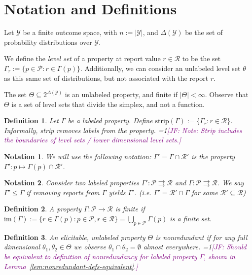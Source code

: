 \documentclass[12pt]{article}
\newcommand{\Comments}{1}
\newcommand{\mynote}[2]{\ifnum\Comments=1\textcolor{#1}{#2}\fi}
\newcommand{\jessie}[1]{\mynote{purple}{[JF: #1]}}
\renewcommand{\P}{\mathcal{P}}
\newcommand{\R}{\mathcal{R}}
\newcommand{\Y}{\mathcal{Y}}
\newcommand{\toto}{\rightrightarrows}
\newcommand{\im}{\text{im}}
\newtheorem{definition}{Definition}
\newtheorem{notation}{Notation}
\begin{document}
\section{Notation and Definitions}


Let $\Y$ be a finite outcome space, with $n:=|\Y|$, and $\Delta(\Y)$ be the set of probability distributions over $\Y$.

We define the \emph{level set} of a property at report value $r\in\R$ to be the set $\Gamma_r := \{p\in\P : r \in \Gamma(p)\}$.
Additionally, we can consider an unlabeled level set $\theta$ as this same set of distributions, but not associated with the report $r$.

The set $\Theta \subseteq 2^{\Delta(\Y)}$ is an unlabeled property, and finite if $|\Theta| < \infty$.
Observe that $\Theta$ is a set of level sets that divide the simplex, and not a function.


\begin{definition}
Let $\Gamma$ be a labeled property.
Define $\text{strip}(\Gamma) := \{ \Gamma_r : r \in \R \}$.
Informally, strip removes labels from the property.
\jessie{Note: Strip includes the boundaries of level sets / lower dimensional level sets.}
\end{definition}

\begin{notation}
We will use the following notation: $\Gamma' = \Gamma \cap \R'$ is the property $\Gamma' : p \mapsto \Gamma(p) \cap \R'$.  
\end{notation}

\begin{notation}
  Consider two labeled properties $\Gamma' : \P \toto \R$ and $\Gamma : \P \toto \R$.
  We say $\Gamma' \leq \Gamma$ if removing reports from $\Gamma$ yields $\Gamma'$.
  (i.e. $\Gamma' = \R' \cap \Gamma$ for some $\R' \subseteq \R$)
\end{notation}

\begin{definition}
A property $\Gamma: \P \to \R$ is \emph{finite} if $\im(\Gamma) := \{r\in\Gamma(p) : p\in\P, r \in \R \} = \bigcup_{p\in\P} \Gamma(p)$ is a finite set.
\end{definition}

\begin{definition}\label{def:unlabeled-nonredundant}
  An elicitable, unlabeled property $\Theta$ is \emph{nonredundant} if for any full dimensional $\theta_1, \theta_2 \in \Theta$ we observe $\theta_1 \cap \theta_2 = \emptyset$ almost everywhere.
  \jessie{Should be equivalent to definition of nonredundancy for labeled property $\Gamma$, shown in Lemma~\ref{lem:nonredundant-defs-equivalent}.}
\end{definition}
\end{document}
